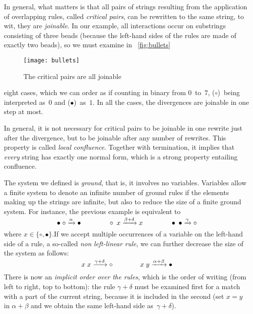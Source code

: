 In general, what matters is that all pairs of strings resulting from
the application of overlapping rules, called \emph{critical
pairs}, can be rewritten to the
same string, to wit, they are \emph{joinable}. In our example, all
interactions occur on substrings consisting of three beads (because
the left\hyp{}hand sides of the rules are made of exactly two beads),
so we must examine in \fig~\vref{fig:bullets}
\begin{figure}[b]
\centering
\texttt{[image: bullets]}
\caption{The critical pairs are all joinable\label{fig:bullets}}
\end{figure}
eight cases, which we can order as if counting in binary from
\(0\)~to~\(7\), (\(\circ\))~being interpreted as~\(0\) and
(\(\bullet\))~as~\(1\). In all the cases, the divergences are joinable
in one step at most.

In general, it is not necessary for critical pairs to be joinable in
one rewrite just after the divergence, but to be joinable after any
number of rewrites. This property is called \emph{local
confluence}. Together
with termination, it implies that \emph{every} string has exactly one
normal form, which is a strong property entailing confluence.

The system we defined is \emph{ground}, that is, it involves no variables. Variables allow a finite
system to denote an infinite number of ground rules if the elements
making up the strings are infinite, but also to reduce the size of a
finite ground system. For instance, the previous example is equivalent
to
\begin{equation*}
\bullet \; \circ \xrightarrow{\smash{\alpha}} \bullet
\qquad\qquad
\circ \; x \xrightarrow{\smash{\beta+\delta}} x
\qquad\qquad
\bullet \; \bullet \xrightarrow{\smash{\gamma}} \circ
\end{equation*}
where \(x \in \{\circ, \bullet\}\).If we accept multiple occurrences
of a variable on the left\hyp{}hand side of a rule, a so\hyp{}called
\emph{non left\hyp{}linear rule},
we can further decrease the size of the system as follows:
\begin{equation*}
x  \; x \xrightarrow{\smash{\gamma+\delta}} \circ\qquad\qquad
x  \; y \xrightarrow{\smash{\alpha+\beta}} \bullet
\end{equation*}
There is now an \emph{implicit order over the rules}, which is the
order of writing (from left to right, top to bottom): the
rule \(\gamma+\delta\) must be examined first for a match with a part
of the current string, because it is included in the second (set
\(x=y\) in \(\alpha+\beta\) and we obtain the same left\hyp{}hand side
as~\(\gamma+\delta\)).

